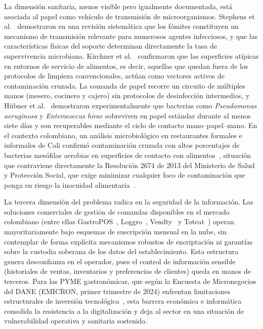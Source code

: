 La dimensión sanitaria, menos visible pero igualmente documentada, está asociada al papel 
como vehículo de transmisión de microorganismos. Stephens et al.~\cite{Stephens2019} 
demostraron en una revisión sistemática que los fómites constituyen un mecanismo de 
transmisión relevante para numerosos agentes infecciosos, y que las características físicas 
del soporte determinan directamente la tasa de supervivencia microbiana. Kirchner 
et al.~\cite{Kirchner2021} confirmaron que las superficies atípicas en entornos de 
servicio de alimentos, es decir, aquellas que quedan fuera de los protocolos de limpieza 
convencionales, actúan como vectores activos de contaminación cruzada. La comanda de papel 
recorre un circuito de múltiples manos (mesero, cocinero y cajero) sin protocolos de 
desinfección intermedios, y Hübner et al.~\cite{Huebner2011} demostraron experimentalmente 
que bacterias como \textit{Pseudomonas aeruginosa} y \textit{Enterococcus hirae} 
sobreviven en papel estándar durante al menos siete días y son recuperables mediante el 
ciclo de contacto mano--papel--mano. En el contexto colombiano, un análisis microbiológico 
en restaurantes formales e informales de Cali confirmó contaminación cruzada con altos 
porcentajes de bacterias mesófilas aerobias en superficies de contacto con 
alimentos~\cite{caro-hernandez_analisis_2020}, situación que contraviene directamente la 
Resolución 2674 de 2013 del Ministerio de Salud y Protección Social, que exige minimizar 
cualquier foco de contaminación que ponga en riesgo la inocuidad 
alimentaria~\cite{minsalud_resolucion2674_2013}.

La tercera dimensión del problema radica en la seguridad de la información. Las soluciones 
comerciales de gestión de comandas disponibles en el mercado colombiano (entre ellas 
GastroPOS~\cite{gastropos}, Loggro~\cite{loggro_planes}, Vendty~\cite{vendty} y 
Toteat~\cite{toteat_planes}) operan mayoritariamente bajo esquemas de suscripción mensual 
en la nube, sin contemplar de forma explícita mecanismos robustos de encriptación ni 
garantías sobre la custodia soberana de los datos del establecimiento. Esta estructura 
genera desconfianza en el operador, pues el control de información sensible (historiales 
de ventas, inventarios y preferencias de clientes) queda en manos de terceros. Para las 
PYME gastronómicas, que según la Encuesta de Micronegocios del DANE (EMICRON, primer 
trimestre de 2024) enfrentan limitaciones estructurales de inversión 
tecnológica~\cite{DANE2024}, esta barrera económica e informática consolida la resistencia 
a la digitalización y deja al sector en una situación de vulnerabilidad operativa y 
sanitaria sostenida.

